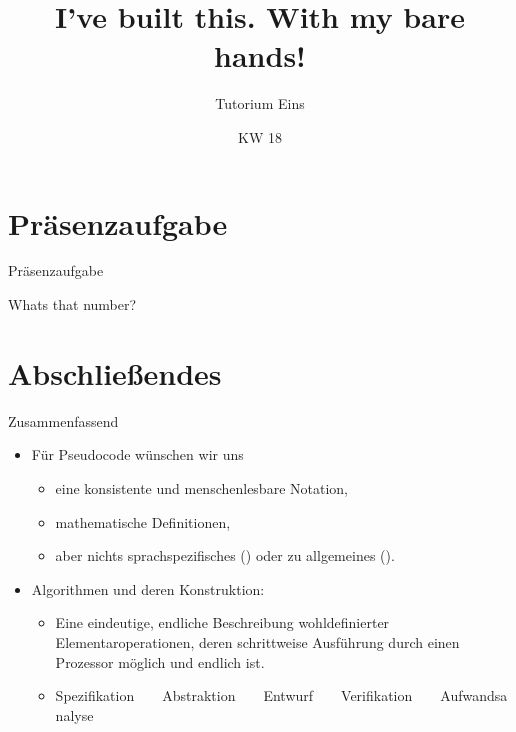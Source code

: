 \relax\relax

\iffull
\title[Erstes Tutorium -- Übungsblatt 1]{I've built this. With my bare hands!}
\subtitle{Tutorium Eins}
\date{KW 18}

\fi
{}

\iffull
\titleframe

\fi


\section{Präsenzaufgabe}
\begin{frame}[c]{Präsenzaufgabe}
\begin{aufgabe}{Whats that number?}

\end{aufgabe}
\end{frame}



\section{Abschließendes}
{\SummaryFrame
\begin{frame}[t]{Zusammenfassend}
\pause \printBibCommand
\vfill\vfill %
\begin{itemize}[<+(1)->]
    \itemsep14pt
    \item Für Pseudocode wünschen wir uns \begin{itemize}
        \itemsep1pt
        \item eine konsistente und menschenlesbare Notation,
        \item mathematische Definitionen,
        \item aber nichts sprachspezifisches () oder zu allgemeines ().
    \end{itemize}
    \item Algorithmen und deren Konstruktion: \begin{itemize}
        \itemsep1pt
        \item Eine eindeutige, endliche Beschreibung wohldefinierter Elementaroperationen, deren schrittweise Ausführung durch einen Prozessor möglich und endlich ist.
        \item \def\t{~~\faAngleRight~~}Spezifikation\t Abstraktion\t Entwurf\t Verifikation\t Aufwandsanalyse
    \end{itemize}
\end{itemize}
\end{frame}
}


\iffull\fi

